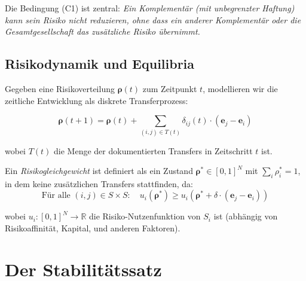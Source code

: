 \documentclass[a4paper, 12pt, twoside, openright]{report}
\theoremstyle{definition}
\theoremstyle{definition}
\begin{document}
Die Bedingung (C1) ist zentral: \emph{Ein Komplementär (mit unbegrenzter Haftung) kann sein Risiko nicht reduzieren, ohne dass ein anderer Komplementär oder die Gesamtgesellschaft das zusätzliche Risiko übernimmt.}

\subsection{Risikodynamik und Equilibria}

Gegeben eine Risikoverteilung $\boldsymbol{\rho}(t)$ zum Zeitpunkt $t$, modellieren wir die zeitliche Entwicklung als diskrete Transferprozess:

\begin{equation}
\boldsymbol{\rho}(t+1) = \boldsymbol{\rho}(t) + \sum_{(i,j) \in T(t)} \delta_{ij}(t) \cdot (\mathbf{e}_j - \mathbf{e}_i)
\end{equation}

wobei $T(t)$ die Menge der dokumentierten Transfers in Zeitschritt $t$ ist.

Ein \emph{Risikogleichgewicht} ist definiert als ein Zustand $\boldsymbol{\rho}^* \in [0,1]^N$ mit $\sum_i \rho_i^* = 1$, in dem keine zusätzlichen Transfers stattfinden, da:
\begin{equation}
\text{Für alle } (i,j) \in S \times S: \quad u_i(\boldsymbol{\rho}^*) \geq u_i(\boldsymbol{\rho}^* + \delta \cdot (\mathbf{e}_j - \mathbf{e}_i))
\end{equation}

wobei $u_i : [0,1]^N \to \mathbb{R}$ die Risiko-Nutzenfunktion von $S_i$ ist (abhängig von Risikoaffinität, Kapital, und anderen Faktoren).

\section{Der Stabilitätssatz}
\end{document}
